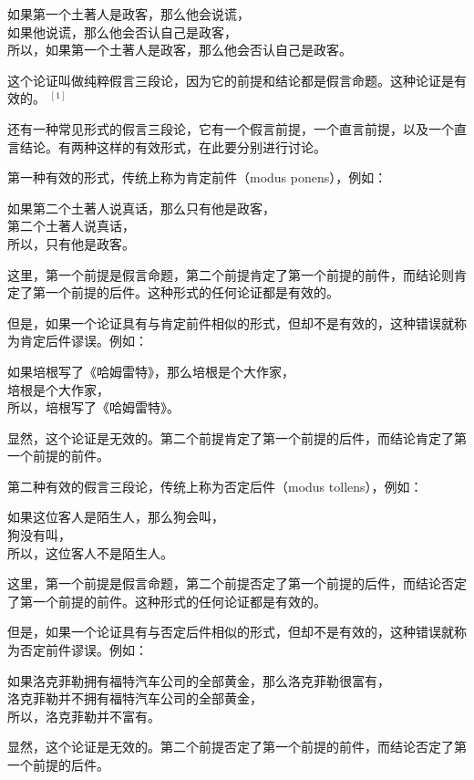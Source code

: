 如果第一个土著人是政客，那么他会说谎，\\
如果他说谎，那么他会否认自己是政客，\\
所以，如果第一个土著人是政客，那么他会否认自己是政客。

这个论证叫做纯粹假言三段论，因为它的前提和结论都是假言命题。这种论证是有效的。 ${ }^{[1]}$

还有一种常见形式的假言三段论，它有一个假言前提，一个直言前提，以及一个直言结论。有两种这样的有效形式，在此要分别进行讨论。

第一种有效的形式，传统上称为肯定前件（modus ponens），例如：

如果第二个土著人说真话，那么只有他是政客，\\
第二个土著人说真话，\\
所以，只有他是政客。

这里，第一个前提是假言命题，第二个前提肯定了第一个前提的前件，而结论则肯定了第一个前提的后件。这种形式的任何论证都是有效的。

但是，如果一个论证具有与肯定前件相似的形式，但却不是有效的，这种错误就称为肯定后件谬误。例如：

如果培根写了《哈姆雷特》，那么培根是个大作家，\\
培根是个大作家，\\
所以，培根写了《哈姆雷特》。

显然，这个论证是无效的。第二个前提肯定了第一个前提的后件，而结论肯定了第一个前提的前件。

第二种有效的假言三段论，传统上称为否定后件（modus tollens），例如：

如果这位客人是陌生人，那么狗会叫，\\
狗没有叫，\\
所以，这位客人不是陌生人。

这里，第一个前提是假言命题，第二个前提否定了第一个前提的后件，而结论否定了第一个前提的前件。这种形式的任何论证都是有效的。

但是，如果一个论证具有与否定后件相似的形式，但却不是有效的，这种错误就称为否定前件谬误。例如：

如果洛克菲勒拥有福特汽车公司的全部黄金，那么洛克菲勒很富有，\\
洛克菲勒并不拥有福特汽车公司的全部黄金，\\
所以，洛克菲勒并不富有。

显然，这个论证是无效的。第二个前提否定了第一个前提的前件，而结论否定了第一个前提的后件。 